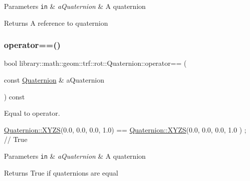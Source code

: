 \begin{DoxyParams}[1]{Parameters}
\mbox{\tt in}  & {\em a\+Quaternion} & A quaternion \\
\hline
\end{DoxyParams}
\begin{DoxyReturn}{Returns}
A reference to quaternion 
\end{DoxyReturn}
\mbox{\label{classlibrary_1_1math_1_1geom_1_1trf_1_1rot_1_1_quaternion_aa3ab0b3893007c45e5cc8ed5e1d16ef0}} 
\subsubsection{\texorpdfstring{operator==()}{operator==()}}
{\footnotesize\ttfamily bool library\+::math\+::geom\+::trf\+::rot\+::\+Quaternion\+::operator== (\begin{DoxyParamCaption}\item[{const \hyperlink{classlibrary_1_1math_1_1geom_1_1trf_1_1rot_1_1_quaternion}{Quaternion} \&}]{a\+Quaternion }\end{DoxyParamCaption}) const}



Equal to operator. 


\begin{DoxyCode}
\hyperlink{classlibrary_1_1math_1_1geom_1_1trf_1_1rot_1_1_quaternion_afff9523c7dcbfbbc521736121e62ad41}{Quaternion::XYZS}(0.0, 0.0, 0.0, 1.0) == \hyperlink{classlibrary_1_1math_1_1geom_1_1trf_1_1rot_1_1_quaternion_afff9523c7dcbfbbc521736121e62ad41}{Quaternion::XYZS}(0.0, 0.0, 0.0, 1.0
      ) ; \textcolor{comment}{// True}
\end{DoxyCode}



\begin{DoxyParams}[1]{Parameters}
\mbox{\tt in}  & {\em a\+Quaternion} & A quaternion \\
\hline
\end{DoxyParams}
\begin{DoxyReturn}{Returns}
True if quaternions are equal 
\end{DoxyReturn}
\mbox{\label{classlibrary_1_1math_1_1geom_1_1trf_1_1rot_1_1_quaternion_a43b2579c18c59f5124e0b864218cbb7b}} 
